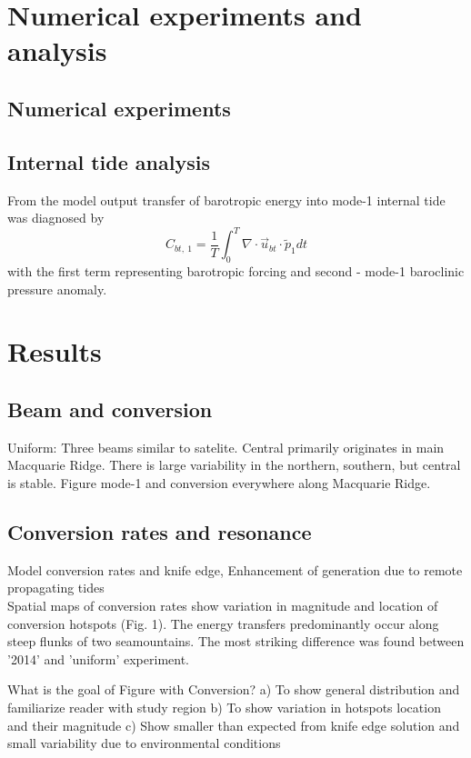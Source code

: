 \section{Numerical experiments and analysis}
\subsection{Numerical experiments}
\subsection{Internal tide analysis}
From the model output transfer of barotropic energy into mode-1 internal tide was diagnosed by
\begin{equation}
C_{bt,~1} = \frac{1}{T} \int_0^T \nabla \cdot \vec{u}_{bt} \cdot \tilde{p}_{1} dt
\end{equation}
with the first term representing barotropic forcing and second - mode-1 baroclinic pressure anomaly.

\section{Results}
\subsection{Beam and conversion}
Uniform: Three beams similar to satelite. Central primarily originates in main Macquarie Ridge. There is large  variability in the northern, southern, but central is stable.
Figure mode-1 and conversion everywhere along Macquarie Ridge.

\subsection{Conversion rates and resonance}
Model conversion rates and knife edge, Enhancement of generation due to remote propagating tides\\
Spatial maps of conversion rates show variation in magnitude and location of conversion hotspots (Fig. 1). The energy transfers predominantly occur along steep flunks of two seamountains. The most striking difference was found between '2014' and 'uniform' experiment. 

What is the goal of Figure with Conversion?
a) To show general distribution and familiarize reader with study region
b) To show variation in hotspots location and their magnitude
c) Show smaller than expected from knife edge solution and small variability due to environmental conditions

